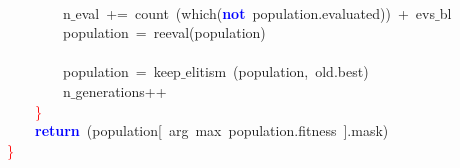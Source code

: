 \mbox{} \\
\mbox{}\ \ \ \ \ \ \ \ n$\_$eval\ \textcolor{BrickRed}{+=}\ count\ \textcolor{BrickRed}{(}which\textcolor{BrickRed}{(}\textbf{\textcolor{Blue}{not}}\ population\textcolor{BrickRed}{.}evaluated\textcolor{BrickRed}{))}\ \textcolor{BrickRed}{+}\ evs$\_$bl \\
\mbox{}\ \ \ \ \ \ \ \ population\ \textcolor{BrickRed}{=}\ reeval\textcolor{BrickRed}{(}population\textcolor{BrickRed}{)} \\
\mbox{} \\
\mbox{}\ \ \ \ \ \ \ \ population\ \textcolor{BrickRed}{=}\ keep$\_$elitism\ \textcolor{BrickRed}{(}population\textcolor{BrickRed}{,}\ old\textcolor{BrickRed}{.}best\textcolor{BrickRed}{)} \\
\mbox{}\ \ \ \ \ \ \ \ n$\_$generations\textcolor{BrickRed}{++} \\
\mbox{}\ \ \ \ \textcolor{Red}{\}} \\
\mbox{}\ \ \ \ \textbf{\textcolor{Blue}{return}}\ \textcolor{BrickRed}{(}population\textcolor{BrickRed}{[}\ arg\ max\ population\textcolor{BrickRed}{.}fitness\ \textcolor{BrickRed}{].}mask\textcolor{BrickRed}{)} \\
\mbox{}\textcolor{Red}{\}} \\
\mbox{}
